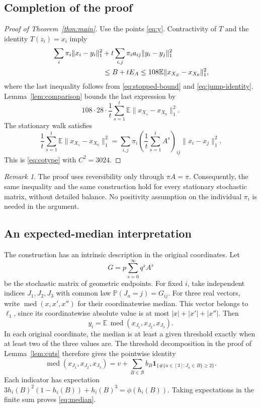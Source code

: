 \documentclass[11pt]{article}
\theoremstyle{definition}
\theoremstyle{remark}
\newtheorem{remark}[theorem]{Remark}
\numberwithin{equation}{section}
\newcommand{\E}{\mathbb E}
\newcommand{\Prob}{\mathbb P}
\newcommand{\ind}{\mathbf 1}
\DeclareMathOperator{\med}{med}
\begin{document}
\subsection{Completion of the proof}
\begin{proof}[Proof of Theorem~\ref{thm:main}]
Use the points \eqref{eq:y}. Contractivity of $T$ and the
identity $T(z_i)=x_i$ imply
\begin{align*}
 &\sum_i\pi_i\|x_i-y_i\|_1^2
       +t\sum_{i,j}\pi_i a_{ij}\|y_i-y_j\|_1^2\\
 &\hspace{25mm}\leq B+tE_A
 \leq108\E\|x_{X_S}-x_{X_0}\|_1^2,
\end{align*}
where the last inequality follows from
\eqref{eq:stopped-bound} and \eqref{eq:jump-identity}.
Lemma~\ref{lem:comparison} bounds the last expression by
\[
 108\cdot28\cdot\frac1t\sum_{s=1}^t
                  \E\|x_{X_s}-x_{X_0}\|_1^2.
\]
The stationary walk satisfies
\[
 \frac1t\sum_{s=1}^t\E\|x_{X_s}-x_{X_0}\|_1^2
 =\sum_{i,j}\pi_i\left(\frac1t\sum_{s=1}^t A^s\right)_{ij}
                  \|x_i-x_j\|_1^2.
\]
This is \eqref{eq:cotype} with $C^2=3024$.
\end{proof}

\begin{remark}\label{rem:stationary}
The proof uses reversibility only through $\pi A=\pi$.
Consequently, the same inequality and the same construction
hold for every stationary stochastic matrix, without detailed
balance. No positivity assumption on the individual $\pi_i$
is needed in the argument.
\end{remark}

\subsection{An expected-median interpretation}
The construction has an intrinsic description in the original
coordinates. Let
\[
 G=p\sum_{s=0}^\infty q^s A^s
\]
be the stochastic matrix of geometric endpoints. For fixed $i$,
take independent indices $J_1,J_2,J_3$ with common law
$\Prob(J_a=j)=G_{ij}$. For three real vectors, write
$\med(x,x',x'')$ for their coordinatewise median. This vector
belongs to $\ell_1$, since its coordinatewise absolute value is
at most $|x|+|x'|+|x''|$. Then
\begin{equation}\label{eq:median}
 y_i=\E\,\med(x_{J_1},x_{J_2},x_{J_3}).
\end{equation}
In each original coordinate, the median is at least a given
threshold exactly when at least two of the three values are.
The threshold decomposition in the proof of
Lemma~\ref{lem:cuts} therefore gives the pointwise identity
\[
 \med(x_{J_1},x_{J_2},x_{J_3})
 =v+\sum_{B\in\mathcal B} b_B
       \ind_{\{\#\{a\in[3]:J_a\in B\}\geq2\}}.
\]
Each indicator has expectation
$3h_i(B)^2(1-h_i(B))+h_i(B)^3=\phi(h_i(B))$.
Taking expectations in the finite sum proves \eqref{eq:median}.
\end{document}
